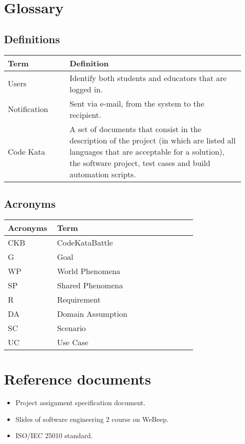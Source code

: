 \section{Glossary}
\subsection{Definitions}
\begin{center}
	\begin{tabular}{@{}p{0.25\linewidth} p{0.71\linewidth}@{}}
		\toprule
		\textbf{Term} & \textbf{Definition}\\
		\midrule
		Users & Identify both students and educators that are logged in. \\
            Notification & Sent via e-mail, from the system to the recipient. \\
            Code Kata & A set of documents that consist in the description of the project (in which are listed all languages that are acceptable for a solution), the software project, test cases and build automation scripts. \\
		\bottomrule
	\end{tabular}
\end{center}

\subsection{Acronyms}
\begin{center}
	\begin{tabular}{@{}p{0.25\linewidth} p{0.71\linewidth}@{}}
		\toprule
		\textbf{Acronyms} & \textbf{Term}\\
		\midrule
		CKB & CodeKataBattle\\
            G & Goal\\
		WP & World Phenomena\\
		SP & Shared Phenomena\\
            R & Requirement\\
            DA & Domain Assumption\\
            SC & Scenario\\
            UC & Use Case\\
		\bottomrule
	\end{tabular}
\end{center}

\section{Reference documents}
\begin{itemize}
	\item Project assignment specification document.
	\item Slides of software engineering 2 course on WeBeep.
        \item ISO/IEC 25010 standard.
\end{itemize}


